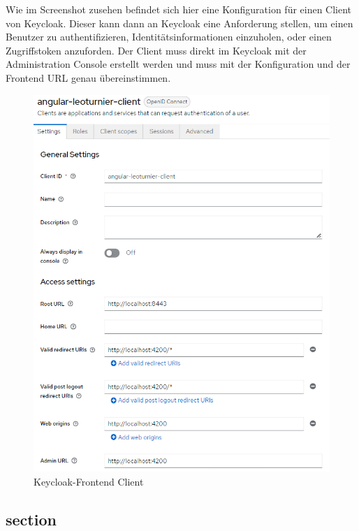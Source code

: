 Wie im Screenshot zusehen befindet sich hier eine Konfiguration für einen Client von Keycloak. Dieser kann dann an Keycloak eine Anforderung stellen, um einen Benutzer zu authentifizieren, Identitätsinformationen einzuholen, oder einen Zugriffstoken anzuforden.
Der Client muss direkt im Keycloak mit der Administration Console erstellt werden und muss mit der Konfiguration und der Frontend URL genau übereinstimmen.

\begin{figure}[H]
    \includegraphics[scale=0.7]{pics/frontend/keycloak_client.PNG}
    \caption{Keycloak-Frontend Client}
\end{figure}

\subsection{section}